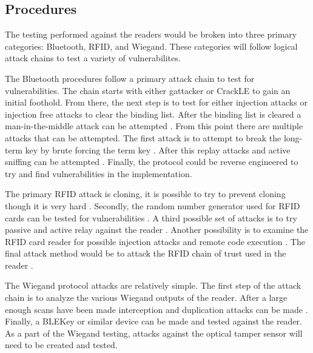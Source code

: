 \documentclass[10pt,twocolumn,letterpaper]{article}
\begin{document}
\subsection{Procedures}
The testing performed against the readers would be broken into three primary categories: Bluetooth, RFID, and Wiegand.  These categories will follow logical attack chains to test a variety of vulnerabilites.

The Bluetooth procedures follow a primary attack chain to test for vulnerabilities.  The chain starts with either gattacker \cite{GattackingJasek} \cite{BluetoothMITMTal} or CrackLE \cite{10.1145/3190645.3190693} to gain an initial foothold.  From there, the next step is to test for either injection attacks or injection free attacks \cite{jaihc19} to clear the binding list.  After the binding list is cleared a man-in-the-middle attack can be attempted \cite{lonzetta2018security} \cite{osullivan} \cite{BluetoothMITMTal}.  From this point there are multiple attacks that can be attempted.  The first attack is to attempt to break the long-term key by brute forcing the term key \cite{sevier2019securityofble} \cite{179196}.  After this replay attacks and active sniffing can be attempted \cite{filizzola2018security} \cite{osullivan}.  Finally, the protocol could be reverse engineered to try and find vulnerabilities in the implementation.

The primary RFID attack is cloning, it is possible to try to prevent cloning though it is very hard \cite{7888545} \cite{dijkPortableBumping} \cite{mitrokotsa09} \cite{7945583}.  Secondly, the random number generator used for RFID cards can be tested for vulnerabilities \cite{6565237} \cite{mitrokotsa09}. A third possible set of attacks is to try passive and active relay against the reader \cite{hancke2009confidence} \cite{6810722}.  Another possibility is to examine the RFID card reader for possible injection attacks and remote code execution \cite{garciaIClass}.  The final attack method would be to attack the RFID chain of trust used in the reader \cite{lehtonen07}.

The Wiegand protocol attacks are relatively simple.  The first step of the attack chain is to analyze the various Wiegand outputs of the reader.  After a large enough scans have been made interception and duplication attacks can be made \cite{chung2017wiegand}. Finally, a BLEKey \cite{baseggio2015BLEKey} or similar device can be made and tested against the reader.  As a part of the Wiegand testing, attacks against the optical tamper sensor will need to be created and tested.
\end{document}
